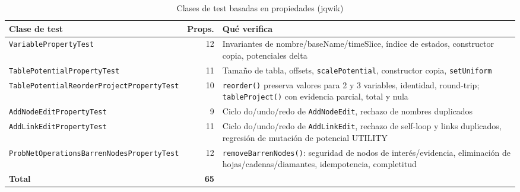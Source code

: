 \documentclass[12pt,a4paper]{article}
\begin{document}
\begin{table}[H]
\centering
\begin{tabularx}{\textwidth}{lrX}
\toprule
\textbf{Clase de test} & \textbf{Props.} & \textbf{Qué verifica} \\
\midrule
\texttt{VariablePropertyTest} & 12 &
  Invariantes de nombre/baseName/timeSlice, índice de estados, constructor
  copia, potenciales delta \\
\texttt{TablePotentialPropertyTest} & 11 &
  Tamaño de tabla, offsets, \texttt{scalePotential}, constructor copia,
  \texttt{setUniform} \\
\texttt{TablePotentialReorderProject\-PropertyTest} & 10 &
  \texttt{reorder()} preserva valores para 2 y 3 variables,
  identidad, round-trip; \texttt{tableProject()} con evidencia parcial,
  total y nula \\
\texttt{AddNodeEditPropertyTest} & 9 &
  Ciclo do/undo/redo de \texttt{AddNodeEdit}, rechazo de nombres
  duplicados \\
\texttt{AddLinkEditPropertyTest} & 11 &
  Ciclo do/undo/redo de \texttt{AddLinkEdit}, rechazo de
  self-loop y links duplicados, regresión de mutación de potencial
  UTILITY \\
\texttt{ProbNetOperationsBarren\-NodesPropertyTest} & 12 &
  \texttt{removeBarrenNodes()}: seguridad de nodos de interés/evidencia,
  eliminación de hojas/cadenas/diamantes, idempotencia,
  completitud \\
\midrule
\textbf{Total} & \textbf{65} & \\
\bottomrule
\end{tabularx}
\caption{Clases de test basadas en propiedades (jqwik)}
\label{tab:tests}
\end{table}
\end{document}

